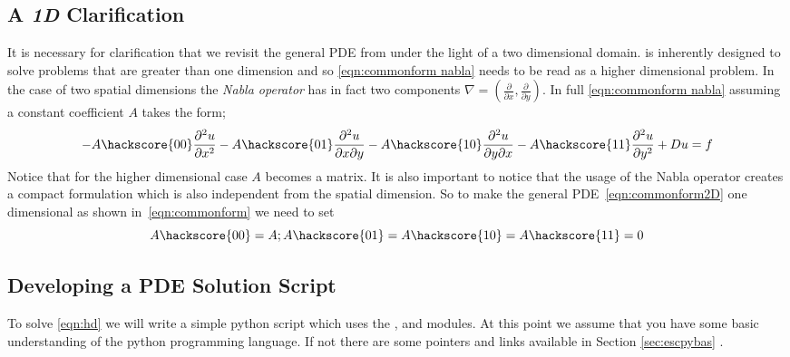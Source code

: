 \subsection{A \textit{1D} Clarification}
It is necessary for clarification that we revisit the general PDE from  under the light of a two dimensional domain. \ESCRIPT is inherently designed to solve problems that are greater than one dimension and so \ref{eqn:commonform nabla} needs to be read as a higher dimensional problem. In the case of two spatial dimensions the \textit{Nabla operator} has in fact two components $\nabla = (\frac{\partial}{\partial x}, \frac{\partial}{\partial y})$. In full \ref{eqn:commonform nabla} assuming a constant coefficient $A$ takes the form;
\begin{equation}\label{eqn:commonform2D}
-A\hackscore{00}\frac{\partial^{2}u}{\partial x^{2}} 
-A\hackscore{01}\frac{\partial^{2}u}{\partial x\partial y} 
-A\hackscore{10}\frac{\partial^{2}u}{\partial y\partial x} 
-A\hackscore{11}\frac{\partial^{2}u}{\partial y^{2}} 
+ Du = f
\end{equation}
Notice that for the higher dimensional case $A$ becomes a matrix. It is also
important to notice that the usage of the Nabla operator creates
a compact formulation which is also independent from the spatial dimension. 
So to make the general PDE~\ref{eqn:commonform2D} one dimensional as
shown in~\ref{eqn:commonform} we need to set
\begin{equation}
A\hackscore{00}=A; A\hackscore{01}=A\hackscore{10}=A\hackscore{11}=0
\end{equation}

\subsection{Developing a PDE Solution Script}
To solve \ref{eqn:hd} we will write a simple python script which uses the \modescript, \modfinley and \modmpl modules. At this point we assume that you have some basic understanding of the python programming language. If not there are some pointers and links available in Section \ref{sec:escpybas} .

